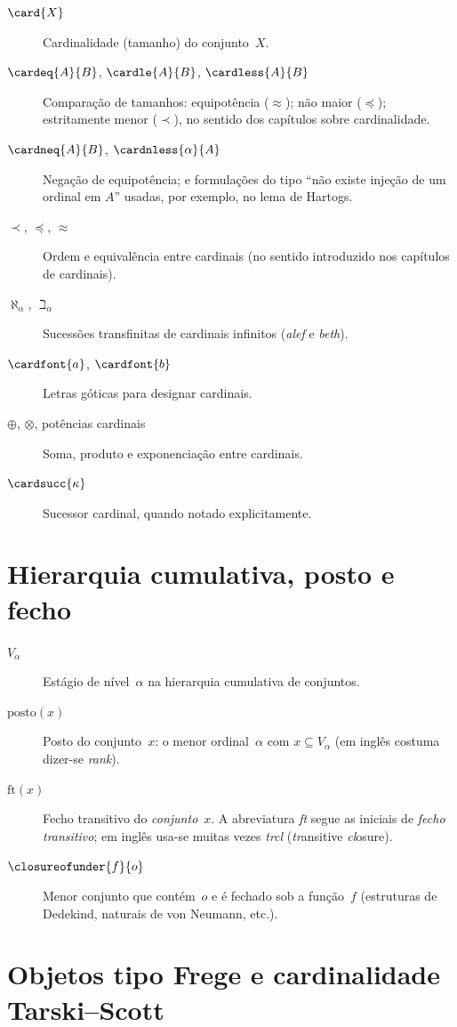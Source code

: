 \begin{description}
\item[$\card{X}$] Cardinalidade (tamanho) do conjunto~$X$.
\item[$\cardeq{A}{B}$, $\cardle{A}{B}$, $\cardless{A}{B}$] Comparação de tamanhos: equipotência ($\approx$); não maior ($\preceq$); estritamente menor ($\prec$), no sentido dos capítulos sobre cardinalidade.
\item[$\cardneq{A}{B}$, $\cardnless{\alpha}{A}$] Negação de equipotência; e formulações do tipo ``não existe injeção de um ordinal em $A$'' usadas, por exemplo, no lema de Hartogs.
\item[$\prec$, $\preceq$, $\approx$] Ordem e equivalência entre cardinais (no sentido introduzido nos capítulos de cardinais).
\item[$\aleph_\alpha$, $\beth_\alpha$] Sucessões transfinitas de cardinais infinitos (\textit{alef} e \textit{beth}).
\item[$\cardfont{a}$, $\cardfont{b}$] Letras góticas para designar cardinais.
\item[$\oplus$, $\otimes$, potências cardinais] Soma, produto e exponenciação entre cardinais.
\item[$\cardsucc{\kappa}$] Sucessor cardinal, quando notado explicitamente.
\end{description}

\section*{Hierarquia cumulativa, posto e fecho}

\begin{description}
\item[$V_\alpha$] Estágio de nível~$\alpha$ na hierarquia cumulativa de conjuntos.
\item[$\mathrm{posto}(x)$] Posto do conjunto~$x$: o menor ordinal~$\alpha$ com $x \subseteq V_\alpha$ (em inglês costuma dizer-se \emph{rank}).
\item[$\mathrm{ft}(x)$] Fecho transitivo do \emph{conjunto}~$x$. A abreviatura \emph{ft} segue as iniciais de \emph{fecho transitivo}; em inglês usa-se muitas vezes \emph{trcl} (\textit{tr}ansitive \textit{cl}osure).
\item[$\closureofunder{f}{o}$] Menor conjunto que contém~$o$ e é fechado sob a função~$f$ (estruturas de Dedekind, naturais de von Neumann, etc.).
\end{description}

\section*{Objetos tipo Frege e cardinalidade Tarski--Scott}

